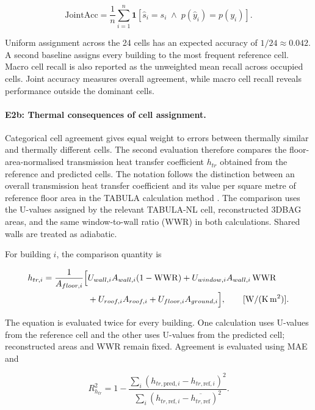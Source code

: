\begin{equation}
	\label{eq:joint_acc}
	\mathrm{JointAcc}
	= \frac{1}{n}\sum_{i=1}^{n}
	\mathbf{1}\!\left[\hat{s}_i = s_i \;\land\; p(\hat{y}_i) = p(y_i)\right].
\end{equation}

Uniform assignment across the 24 cells has an expected accuracy of $1/24 \approx 0.042$. A second baseline assigns every building to the most frequent reference cell. Macro cell recall is also reported as the unweighted mean recall across occupied cells. Joint accuracy measures overall agreement, while macro cell recall reveals performance outside the dominant cells.

\paragraph{E2b: Thermal consequences of cell assignment.}
Categorical cell agreement gives equal weight to errors between thermally similar and thermally different cells. The second evaluation therefore compares the floor-area-normalised transmission heat transfer coefficient $h_{tr}$ obtained from the reference and predicted cells. The notation follows the distinction between an overall transmission heat transfer coefficient and its value per square metre of reference floor area in the TABULA calculation method \parencite{loga2013calculation}. The comparison uses the U-values assigned by the relevant TABULA-NL cell, reconstructed 3DBAG areas, and the same window-to-wall ratio (WWR) in both calculations. Shared walls are treated as adiabatic.

For building $i$, the comparison quantity is

\begin{equation}
	\label{eq:htr}
	\begin{split}
		h_{tr,i} = \frac{1}{A_{floor,i}} \Bigl[
		 & U_{wall,i}A_{wall,i}(1-\mathrm{WWR}) + U_{window,i}A_{wall,i}\,\mathrm{WWR} \\
		 & + U_{roof,i}A_{roof,i} + U_{floor,i}A_{ground,i} \Bigr],
		 \qquad [\mathrm{W/(K\,m^2)}] .
	\end{split}
\end{equation}

The equation is evaluated twice for every building. One calculation uses U-values from the reference cell and the other uses U-values from the predicted cell; reconstructed areas and WWR remain fixed. Agreement is evaluated using MAE and

\begin{equation}
	\label{eq:htr_r2}
	R^2_{h_{tr}}
	= 1 - \frac{\sum_i\left(h_{tr,\mathrm{pred},i} - h_{tr,\mathrm{ref},i}\right)^2}
	{\sum_i\left(h_{tr,\mathrm{ref},i} - \overline{h_{tr,\mathrm{ref}}}\right)^2}.
\end{equation}

